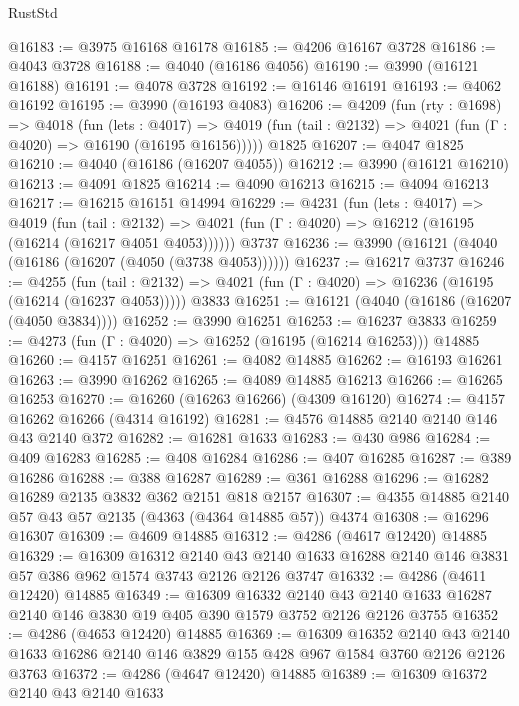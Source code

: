 \begin{lexlean}{RustStd}
\begin{coremodule}
{\begin{coremodule}
{{{{{{{{{{{{{{{{@16183 := @3975 @16168 @16178
@16185 := @4206 @16167 @3728
@16186 := @4043 @3728
@16188 := @4040 (@16186 @4056)
@16190 := @3990 (@16121 @16188)
@16191 := @4078 @3728
@16192 := @16146 @16191
@16193 := @4062 @16192
@16195 := @3990 (@16193 @4083)
@16206 := @4209
    (fun (rty : @1698) =>
    @4018
      (fun (lets : @4017) =>
      @4019 (fun (tail : @2132) => @4021 (fun (Γ : @4020) => @16190 (@16195 @16156)))))
    @1825
@16207 := @4047 @1825
@16210 := @4040 (@16186 (@16207 @4055))
@16212 := @3990 (@16121 @16210)
@16213 := @4091 @1825
@16214 := @4090 @16213
@16215 := @4094 @16213
@16217 := @16215 @16151 @14994
@16229 := @4231
    (fun (lets : @4017) =>
    @4019
      (fun (tail : @2132) =>
      @4021 (fun (Γ : @4020) => @16212 (@16195 (@16214 (@16217 @4051 @4053))))))
    @3737
@16236 := @3990 (@16121 (@4040 (@16186 (@16207 (@4050 (@3738 @4053))))))
@16237 := @16217 @3737
@16246 := @4255
    (fun (tail : @2132) => @4021 (fun (Γ : @4020) => @16236 (@16195 (@16214 (@16237 @4053)))))
    @3833
@16251 := @16121 (@4040 (@16186 (@16207 (@4050 @3834))))
@16252 := @3990 @16251
@16253 := @16237 @3833
@16259 := @4273 (fun (Γ : @4020) => @16252 (@16195 (@16214 @16253))) @14885
@16260 := @4157 @16251
@16261 := @4082 @14885
@16262 := @16193 @16261
@16263 := @3990 @16262
@16265 := @4089 @14885 @16213
@16266 := @16265 @16253
@16270 := @16260 (@16263 @16266) (@4309 @16120)
@16274 := @4157 @16262 @16266 (@4314 @16192)
@16281 := @4576 @14885 @2140 @2140 @146 @43 @2140 @372
@16282 := @16281 @1633
@16283 := @430 @986
@16284 := @409 @16283
@16285 := @408 @16284
@16286 := @407 @16285
@16287 := @389 @16286
@16288 := @388 @16287
@16289 := @361 @16288
@16296 := @16282 @16289 @2135 @3832 @362 @2151 @818 @2157
@16307 := @4355 @14885 @2140 @57 @43 @57 @2135 (@4363 (@4364 @14885 @57)) @4374
@16308 := @16296 @16307
@16309 := @4609 @14885
@16312 := @4286 (@4617 @12420) @14885
@16329 := @16309
    @16312
    @2140
    @43
    @2140
    @1633
    @16288
    @2140
    @146
    @3831
    @57
    @386
    @962
    @1574
    @3743
    @2126
    @2126
    @3747
@16332 := @4286 (@4611 @12420) @14885
@16349 := @16309
    @16332
    @2140
    @43
    @2140
    @1633
    @16287
    @2140
    @146
    @3830
    @19
    @405
    @390
    @1579
    @3752
    @2126
    @2126
    @3755
@16352 := @4286 (@4653 @12420) @14885
@16369 := @16309
    @16352
    @2140
    @43
    @2140
    @1633
    @16286
    @2140
    @146
    @3829
    @155
    @428
    @967
    @1584
    @3760
    @2126
    @2126
    @3763
@16372 := @4286 (@4647 @12420) @14885
@16389 := @16309
    @16372
    @2140
    @43
    @2140
    @1633
}}}}}}}}}}}}}}}}
\end{coremodule}}
\end{coremodule}
\end{lexlean}
